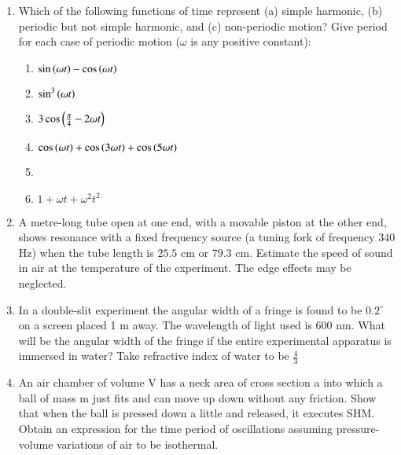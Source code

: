 \begin{enumerate}[label=\thesection.\arabic*,ref=\thesection.\theenumi]
\item Which of the following functions of time represent (a) simple harmonic, (b) periodic
 but not simple harmonic, and (c) non-periodic motion? Give period for each case of periodic motion ($\omega$ is any positive constant):\\
 \begin{enumerate}
 \item $\sin\left(\omega t\right)-\cos\left(\omega t\right)$\\
 \item $\sin^3\left(\omega t\right)$\\
 \item $3\cos\left(\frac{\pi}{4}- 2\omega t\right)$\\
 \item $\cos\left(\omega t\right)+\cos\left(3\omega t\right)+\cos\left(5\omega t\right)$\\
 \item {}\\
 \item $1+\omega t+\omega^2 t^2$\\
  \end{enumerate}
 \solution

 \pagebreak

 \item A metre-long tube open at one end, with a movable piston at the other end, shows resonance with a fixed frequency source (a tuning fork of frequency $340$ Hz) when the tube length is $25.5$ cm or $79.3$ cm. Estimate the speed of sound in air at the temperature of the experiment. The edge effects may be neglected.\\
 \solution
 \pagebreak
\item In a double-slit experiment the angular width of a fringe is found to
be $0.2^\circ$ on a screen placed 1 m away. The wavelength of light used is
600 nm. What will be the angular width of the fringe if the entire
experimental apparatus is immersed in water? Take refractive index
of water to be $\frac{4}{3}$
\solution
\pagebreak
\item An air chamber of volume V has a neck area of cross section a into which a ball of mass m just fits and can move up down without any friction. Show that when the ball is pressed down a little and released, it executes SHM. Obtain an expression for the time period of oscillations assuming pressure-volume variations of air to be isothermal.
\solution
\pagebreak


\end{enumerate}
